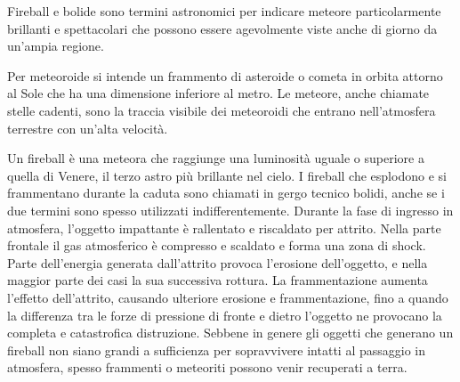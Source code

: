 Fireball e bolide sono termini astronomici per indicare meteore particolarmente brillanti e spettacolari che possono essere agevolmente viste anche di giorno da un'ampia regione. 

Per meteoroide si intende un frammento di asteroide o cometa in orbita attorno al Sole che ha una dimensione inferiore al metro. Le meteore, anche chiamate stelle cadenti, sono la traccia visibile dei meteoroidi che entrano nell'atmosfera terrestre con un'alta velocità. 

Un fireball è una meteora che raggiunge una luminosità uguale o superiore a quella di Venere, il terzo astro più brillante nel cielo. I fireball che esplodono e si frammentano durante la caduta sono chiamati in gergo tecnico bolidi, anche se i due termini sono spesso utilizzati indifferentemente. Durante la fase di ingresso in atmosfera, l'oggetto impattante è rallentato e riscaldato per attrito. Nella parte frontale il gas atmosferico è compresso e scaldato e forma una zona di shock. Parte dell'energia generata dall'attrito provoca l'erosione dell'oggetto, e nella maggior parte dei casi la sua successiva rottura. La frammentazione aumenta l'effetto dell'attrito, causando ulteriore erosione e frammentazione, fino a quando la differenza tra le forze di pressione di fronte e dietro l'oggetto ne provocano la completa e catastrofica distruzione. Sebbene in genere gli oggetti che generano un fireball non siano grandi a sufficienza per sopravvivere intatti al passaggio in atmosfera, spesso frammenti o meteoriti possono venir recuperati a terra.
\cite{bolide-fireball}